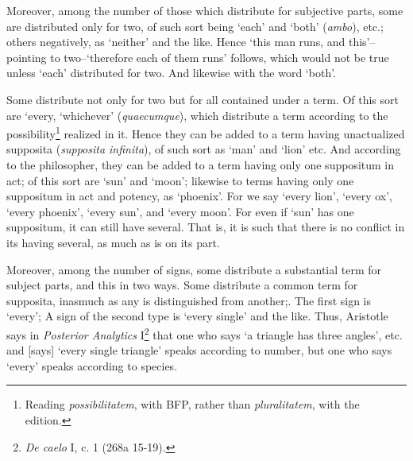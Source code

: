 \documentclass[]{article}
\begin{document}
\begin{itemize}
Moreover, among the number of those which distribute for subjective parts, some are distributed only for two, of such sort being `each' and `both' (\textit{ambo}), etc.; others negatively, as `neither' and the like. Hence `this man runs, and this'--pointing to two--`therefore each of them runs' follows, which would not be true unless `each' distributed for two. And likewise with the word `both'. 

Some distribute not only for two but for all contained under a term. Of this sort are `every, `whichever' (\textit{quaecumque}), which distribute a term according to the possibility\footnote{Reading \textit{possibilitatem}, with BFP, rather than \textit{pluralitatem}, with the edition.} realized in it. Hence they can be added to a term having unactualized supposita (\textit{supposita infinita}), of such sort as `man' and `lion' etc. And according to the philosopher, they can be added to a term having only one suppositum in act; of this sort are `sun' and `moon'; likewise to terms having only one suppositum in act and potency, as `phoenix'. For we say `every lion', `every ox', `every phoenix', `every sun', and `every moon'. For even if `sun' has one suppositum, it can still have several. That is, it is such that there is no conflict in its having several, as much as is on its part. 

Moreover, among the number of signs, some distribute a substantial term for subject parts, and this in two ways. Some distribute a common term for supposita, inasmuch as any is distinguished from another;. The first sign is `every'; A sign of the second type is `every single' and the like. Thus, Aristotle says in \textit{Posterior Analytics} I\footnote{\textit{De caelo} I, c. 1 (268a 15-19).} that one who says `a triangle has three angles', etc. and [says] `every single triangle' speaks according to number, but one who says `every' speaks according to species.


\end{itemize}
\end{document}
